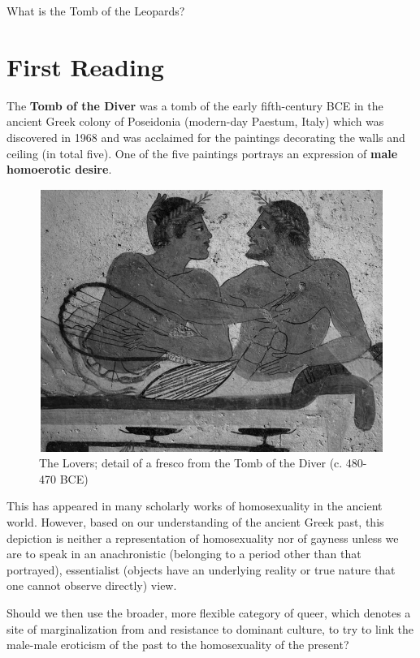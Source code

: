 \begin{qst}
    What is the Tomb of the Leopards?
\end{qst}


\section{First Reading}
\label{sec:FirRead3}

The \textbf{Tomb of the Diver} was a tomb of the early fifth-century BCE in the ancient Greek colony of Poseidonia (modern-day Paestum, Italy) which was discovered in 1968 and was acclaimed for the paintings decorating the walls and ceiling (in total five). One of the five paintings portrays an expression of \textbf{male homoerotic desire}.

\begin{figure}[H]
    \centering
    \includegraphics[scale = 0.4]{../images/TheLovers.PNG}
    \caption{The Lovers; detail of a fresco from the Tomb of the Diver (c. 480-470 BCE)}
    \label{fig:love}
\end{figure}

This has appeared in many scholarly works of homosexuality in the ancient world. However, based on our understanding of the ancient Greek past, this depiction is neither a representation of homosexuality nor of gayness unless we are to speak in an anachronistic (belonging to a period other than that portrayed), essentialist (objects have an underlying reality or true nature that one cannot observe directly) view.

\begin{qst}
    Should we then use the broader, more flexible category of queer, which denotes a site of marginalization from and resistance to dominant culture, to try to link the male-male eroticism of the past to the homosexuality of the present?
\end{qst}

